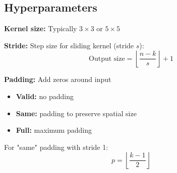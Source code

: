 \subsection{Hyperparameters}

\textbf{Kernel size:} Typically $3 \times 3$ or $5 \times 5$

\textbf{Stride:} Step size for sliding kernel (stride $s$):
\begin{equation}
\text{Output size} = \left\lfloor \frac{n - k}{s} \right\rfloor + 1
\end{equation}

\textbf{Padding:} Add zeros around input
\begin{itemize}
    \item \textbf{Valid:} no padding
    \item \textbf{Same:} padding to preserve spatial size
    \item \textbf{Full:} maximum padding
\end{itemize}

For "same" padding with stride 1:
\begin{equation}
p = \left\lfloor \frac{k-1}{2} \right\rfloor
\end{equation}

